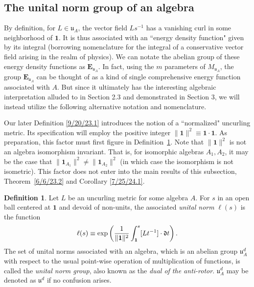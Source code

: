 \documentclass{amsart}
\numberwithin{equation}{section}
\theoremstyle{definition}
\newtheorem{definition}[theorem]{Definition}
\numberwithin{theorem}{section}
\begin{document}
\subsection{The unital norm group of an algebra} By definition, for \mbox{$L\in \mathfrak{u}_A$}, the vector field $Ls^{-1}$ has a vanishing curl in some neighborhood of $\mathbf{1}$.  It is thus associated with an ``energy density function" given by its integral (borrowing nomenclature for the integral of a conservative vector field arising in the realm of physics).   
 We can notate the abelian group of these energy density functions as $\mathbf{E}_{\mathfrak{u}_A}$.  In fact, using the $m$ parameters of $M_{\mathfrak{u}_A}$, the group $\mathbf{E}_{\mathfrak{u}_A}$ can be thought of as a kind of single comprehensive energy function associated with $A$.  But since it ultimately has the interesting algebraic interpretation alluded to in Section 2.3 and demonstrated in Section 3, we will instead utilize the following alternative notation and nomenclature.
  
Our later Definition \ref{9/20/23.1} introduces the notion of a ``normalized" uncurling metric.  Its specification will employ the positive integer $\|\mathbf{1}\|^2 \equiv \mathbf{1} \cdot \mathbf{1}$. As preparation, this factor must first figure in \mbox{Definition \ref{9/21/23.2}}.   Note that $\|\mathbf{1}\|^2$ is not an algebra isomorphism invariant.  That is, for isomorphic algebras $A_1,A_2$, it may be the case that $\|\mathbf{1}_{A_1}\|^2 \ne \|\mathbf{1}_{A_2}\|^2$ (in which case the isomorphism is not isometric).  This factor does not enter into the main results of this subsection, \mbox{Theorem \ref{6/6/23.2}} and Corollary \ref{7/25/24.1}.
  
  \begin{definition}\label{9/21/23.2} Let $L$ be an uncurling metric for some algebra $A$.  For $s$ in an open ball centered at $\mathbf{1}$ and devoid of non-units, the associated {\it unital norm} $ \ell(s)$ is the function 
  \begin{equation}\label{11/7/20.2}   \ell(s) \equiv \exp\left(\frac{1}{\|{\bf 1}\|^2}\int_{\bf 1}^s [Lt^{-1}]\cdot \mathfrak{d}t\right).\end{equation} 
   The set of unital norms associated with an algebra, which is an abelian group $\mathfrak{u}^d_A$ with respect to the usual point-wise operation of multiplication of functions, is called the {\it unital norm group}, also known as the {\it dual of the anti-rotor}. $\mathfrak{u}^d_A$ may be denoted as $\mathfrak{u}^d$ if no confusion arises. \end{definition} 
   
\end{document}
